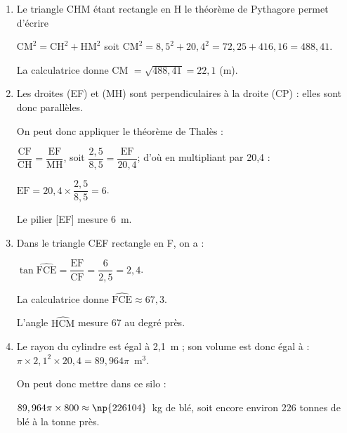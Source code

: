 \medskip

\begin{enumerate}
\item %
Le triangle CHM étant rectangle en H le théorème de Pythagore permet d'écrire 

$\text{CM}^2 = \text{CH}^2 + \text{HM}^2$ soit $\text{CM}^2 = 8,5^2 + 20,4^2 = 72,25 + 416,16 = 488,41$.

La calculatrice donne CM $ = \sqrt{488,41} = 22,1$ (m).
\item %
Les droites (EF) et (MH) sont perpendiculaires à la droite (CP) : elles sont donc parallèles.

On peut donc appliquer le théorème de Thalès :

$\dfrac{\text{CF}}{\text{CH}} = \dfrac{\text{EF}}{\text{MH}}$, soit $\dfrac{2,5}{8,5} = \dfrac{\text{EF}}{20,4}$; d'où en multipliant par 20,4 :

$\text{EF} = 20,4 \times \dfrac{2,5}{8,5} = 6$.

Le pilier [EF] mesure 6~m.
\item %
Dans le triangle CEF rectangle en F, on a :

$\tan \widehat{\text{FCE}} = \dfrac{\text{EF}}{\text{CF}} = \dfrac{6}{2,5} = 2,4$.

La calculatrice donne $\widehat{\text{FCE}}  \approx 67,3$.

L'angle $\widehat{\text{HCM}}$ mesure 67\degres{} au degré près.
\item %


%
%
Le rayon du cylindre est égal à 2,1~m ; son volume est donc égal à : $\pi \times 2,1^2 \times 20,4 = 89,964\pi$~m$^3$.

On peut donc mettre dans ce silo : 

$89,964\pi \times 800 \approx \np{226104}$~kg de blé, soit encore environ 226 tonnes de blé à la tonne près.
\end{enumerate}

\vspace{0,5cm}

